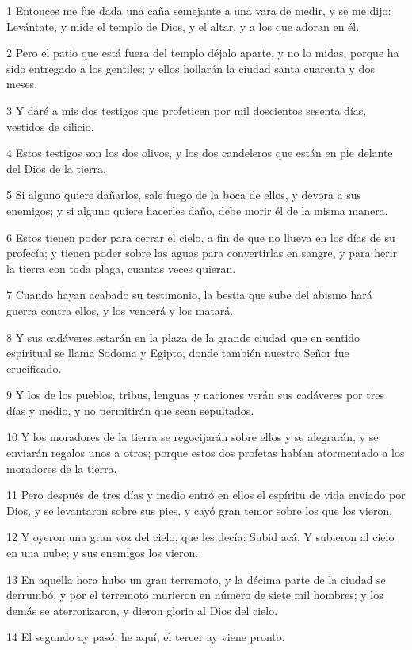 \par 1 Entonces me fue dada una caña semejante a una vara de medir, y se me dijo: Levántate, y mide el templo de Dios, y el altar, y a los que adoran en él.
\par 2 Pero el patio que está fuera del templo déjalo aparte, y no lo midas, porque ha sido entregado a los gentiles; y ellos hollarán la ciudad santa cuarenta y dos meses.
\par 3 Y daré a mis dos testigos que profeticen por mil doscientos sesenta días, vestidos de cilicio.
\par 4 Estos testigos son los dos olivos, y los dos candeleros que están en pie delante del Dios de la tierra.
\par 5 Si alguno quiere dañarlos, sale fuego de la boca de ellos, y devora a sus enemigos; y si alguno quiere hacerles daño, debe morir él de la misma manera.
\par 6 Estos tienen poder para cerrar el cielo, a fin de que no llueva en los días de su profecía; y tienen poder sobre las aguas para convertirlas en sangre, y para herir la tierra con toda plaga, cuantas veces quieran.
\par 7 Cuando hayan acabado su testimonio, la bestia que sube del abismo hará guerra contra ellos, y los vencerá y los matará.
\par 8 Y sus cadáveres estarán en la plaza de la grande ciudad que en sentido espiritual se llama Sodoma y Egipto, donde también nuestro Señor fue crucificado.
\par 9 Y los de los pueblos, tribus, lenguas y naciones verán sus cadáveres por tres días y medio, y no permitirán que sean sepultados.
\par 10 Y los moradores de la tierra se regocijarán sobre ellos y se alegrarán, y se enviarán regalos unos a otros; porque estos dos profetas habían atormentado a los moradores de la tierra.
\par 11 Pero después de tres días y medio entró en ellos el espíritu de vida enviado por Dios, y se levantaron sobre sus pies, y cayó gran temor sobre los que los vieron.
\par 12 Y oyeron una gran voz del cielo, que les decía: Subid acá. Y subieron al cielo en una nube; y sus enemigos los vieron.
\par 13 En aquella hora hubo un gran terremoto, y la décima parte de la ciudad se derrumbó, y por el terremoto murieron en número de siete mil hombres; y los demás se aterrorizaron, y dieron gloria al Dios del cielo.
\par 14 El segundo ay pasó; he aquí, el tercer ay viene pronto.


